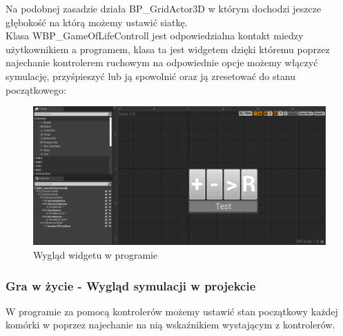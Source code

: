 \documentclass[a4paper,12pt,reqno]{article}
\begin{document}
Na podobnej zasadzie działa BP\_GridActor3D w którym dochodzi jeszcze głębokość na którą możemy ustawić siatkę.\\

Klasa WBP\_GameOfLifeControll jest odpowiedzialna kontakt miedzy użytkownikiem a programem, klasa ta jest widgetem dzięki któremu poprzez najechanie kontrolerem ruchowym na odpowiednie opcje możemy włączyć symulację, przyśpieszyć lub ją spowolnić oraz ją zresetować do stanu początkowego:

\begin{figure}[H]%
\centering
\includegraphics[width=0.7\columnwidth]{graphics/gameoflife/GameOfLifeControllInUE_1.png}
\caption{Wygląd widgetu w programie
\label{BPExample}}%
%
\qquad
\end{figure}  

\subsubsection{Gra w życie - Wygląd symulacji w projekcie}
W programie za pomocą kontrolerów możemy ustawić stan początkowy każdej komórki w poprzez najechanie na nią wskaźnikiem wystającym z kontrolerów.
\end{document}
